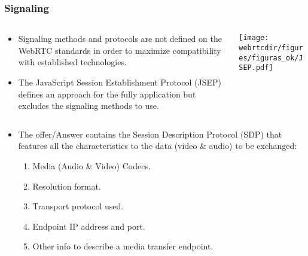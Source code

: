 \begin{frame}\frametitle{Signaling}
 
\begin{columns}
\begin{column}{0.48\textwidth}

\begin{itemize}
\item Signaling methods and protocols are not defined on the WebRTC standards
in order to maximize compatibility with established technologies. 
\item The JavaScript Session Establishment Protocol (JSEP) defines an approach 
for the fully application but excludes the signaling methods to use.
\end{itemize}
\end {column}
\begin{column}{0.48\textwidth}
\texttt{[image: \\webrtcdir/figures/figuras\_ok/JSEP.pdf]}
\end{column}
\end {columns}


\begin{itemize}

\item The offer/Answer contains the Session Description Protocol (SDP) that features all the characteristics to the data (video \& audio) to be exchanged:
  \begin{enumerate}
  \item Media (Audio \& Video) Codecs.
  \item Resolution format.
  \item Transport protocol used.
  \item Endpoint IP address and port.
  \item Other info to describe a media transfer endpoint.
  \end{enumerate}
\end{itemize}
\end{frame}


